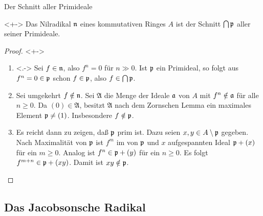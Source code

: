 \begin{frame}{Der Schnitt aller Primideale}
    \begin{proposition}<+->
        Das Nilradikal \(\mathfrak{n}\) eines kommutativen Ringes \(A\) ist der Schnitt
        \(\bigcap \mathfrak{p}\) aller seiner Primideale.
    \end{proposition}
    \begin{proof}<+->
        \begin{enumerate}[<+->]
        \item<.->
            Sei \(f \in \mathfrak{n}\), also \(f^n = 0\) für \(n \gg 0\). Ist \(\mathfrak{p}\)
            ein Primideal, so folgt aus \(f^n = 0 \in \mathfrak{p}\) schon \(f \in \mathfrak{p}\),
            also \(f \in \bigcap \mathfrak{p}\).
        \item
            Sei umgekehrt \(f \notin \mathfrak{n}\). Sei \(\mathfrak A\) die Menge der
            Ideale \(\mathfrak{a}\) von \(A\) mit \(f^n \notin \mathfrak{a}\) für alle
            \(n \ge 0\). Da \((0) \in \mathfrak A\), besitzt \(\mathfrak A\) nach dem 
            Zornschen Lemma ein maximales Element \(\mathfrak{p} \neq (1)\). Insbesondere
            \(f \notin \mathfrak{p}\).
        \item
            Es reicht dann zu zeigen, daß \(\mathfrak{p}\) prim ist. Dazu seien \(x, y
            \in A \setminus \mathfrak{p}\) gegeben. Nach Maximalität von \(\mathfrak{p}\)
            ist \(f^m\) im von \(\mathfrak{p}\) und \(x\) aufgespannten Ideal
            \(\mathfrak{p} + (x)\) für ein
            \(m \ge 0\). Analog ist \(f^n \in \mathfrak{p} + (y)\) für ein \(n \ge 0\).
            Es folgt \(f^{m + n} \in \mathfrak{p} + (xy)\). Damit ist \(xy \notin \mathfrak{p}\).
            \qedhere
        \end{enumerate}
    \end{proof}
\end{frame}

\subsection{Das Jacobsonsche Radikal}

